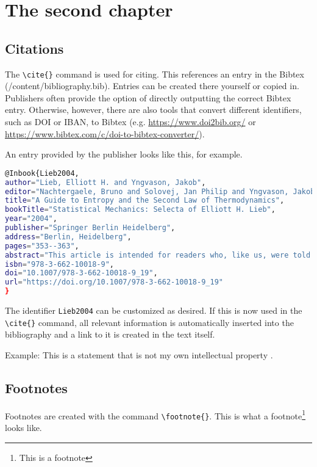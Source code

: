 \chapter{The second chapter}

\section{Citations}
The \texttt{\textbackslash{}cite\{\}} command is used for citing. This references an entry in the Bibtex (/content/bibliography.bib). Entries can be created there yourself or copied in. Publishers often provide the option of directly outputting the correct Bibtex entry. Otherwise, however, there are also tools that convert different identifiers, such as DOI or IBAN, to Bibtex (e.g. \href{https://www.doi2bib.org/}{https://www.doi2bib.org/} or \href{https://www.bibtex.com/c/doi-to-bibtex-converter/}{https://www.bibtex.com/c/doi-to-bibtex-converter/}).

An entry provided by the publisher looks like this, for example.
\begin{lstlisting}[caption=Example of an bibtex entry, label=lst:bibtex_def_en, language=bash]
@Inbook{Lieb2004,
author="Lieb, Elliott H. and Yngvason, Jakob",
editor="Nachtergaele, Bruno and Solovej, Jan Philip and Yngvason, Jakob",
title="A Guide to Entropy and the Second Law of Thermodynamics",
bookTitle="Statistical Mechanics: Selecta of Elliott H. Lieb",
year="2004",
publisher="Springer Berlin Heidelberg",
address="Berlin, Heidelberg",
pages="353--363",
abstract="This article is intended for readers who, like us, were told that the second law of thermodynamics is one of the major achievements of the nineteenth cenwry---that it is a logical, perfect, and unbreakable law---but who were unsatisfied with the ``derivations'' of the entropy principle as found in textbooks and in popular writings.",
isbn="978-3-662-10018-9",
doi="10.1007/978-3-662-10018-9_19",
url="https://doi.org/10.1007/978-3-662-10018-9_19"
}
\end{lstlisting}

The identifier \texttt{Lieb2004} can be customized as desired. If this is now used in the \texttt{\textbackslash{}cite\{\}} command, all relevant information is automatically inserted into the bibliography and a link to it is created in the text itself.

Example: This is a statement that is not my own intellectual property \cite{Lieb2004}.


\section{Footnotes}
Footnotes are created with the command \texttt{\textbackslash{}footnote\{\}}. This is what a footnote\footnote{This is a footnote} looks like.

